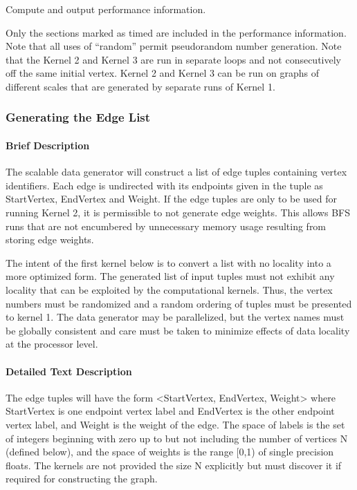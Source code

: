 \documentclass{article}
\begin{document}
Compute and output performance information.

Only the sections marked as timed are included in the performance information. Note that all uses of ``random'' permit pseudorandom number generation. Note that the Kernel 2 and Kernel 3 are run in separate loops and not consecutively off the same initial vertex. Kernel 2 and Kernel 3 can be run on graphs of different scales that are generated by separate runs of Kernel 1.

\subsubsection*{Generating the Edge List}

\paragraph*{Brief Description}

The scalable data generator will construct a list of edge tuples containing vertex identifiers. Each edge is undirected with its endpoints given in the tuple as StartVertex, EndVertex and Weight. If the edge tuples are only to be used for running Kernel 2, it is permissible to not generate edge weights. This allows BFS runs that are not encumbered by unnecessary memory usage resulting from storing edge weights.

The intent of the first kernel below is to convert a list with no locality into a more optimized form. The generated list of input tuples must not exhibit any locality that can be exploited by the computational kernels. Thus, the vertex numbers must be randomized and a random ordering of tuples must be presented to kernel 1. The data generator may be parallelized, but the vertex names must be globally consistent and care must be taken to minimize effects of data locality at the processor level.

\paragraph*{Detailed Text Description}

The edge tuples will have the form \textless{}StartVertex, EndVertex, Weight\textgreater{} where StartVertex is one endpoint vertex label and EndVertex is the other endpoint vertex label, and Weight is the weight of the edge. The space of labels is the set of integers beginning with zero up to but not including the number of vertices N (defined below), and the space of weights is the range [0,1) of single precision floats. The kernels are not provided the size N explicitly but must discover it if required for constructing the graph.
\end{document}
